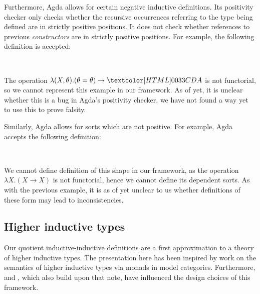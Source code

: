 Furthermore, Agda allows for certain negative inductive
definitions. Its positivity checker only checks whether the recursive
occurrences referring to the type being defined are in strictly
positive positions. It does not check whether references to previous
\emph{constructors} are in strictly positive positions. For example,
the following definition is accepted:
%
\begin{datatype}{\Aty}{\Set}
  \constr{\Aco}{\Aty} \\
  \constr{\Aci}{((\Aco = \Aco) \to \Aty) \to \Aty}
\end{datatype}
%
The operation $\lambda (X,\theta) . (\theta = \theta) \to \Aty$ is not
functorial, so we cannot represent this example in our framework. As
of yet, it is unclear whether this is a bug in Agda's positivity
checker, \ie we have not found a way yet to use this to prove falsity.

Similarly, Agda allows for sorts which are not positive. For example,
Agda accepts the following definition:
%
\begin{sorts}
    \sortnamety{\Aty}{\Set} \\
    \sortnamety{\Bty}{(\Aty \to \Aty) \to \Set}  
\end{sorts}
%
\begin{datatype}{\Aty}{}
  \constr{\Aco}{\Aty}
\end{datatype}
%
\begin{datatype}{\Bty}{}
\end{datatype}
%
We cannot define definition of this shape in our framework, as the
operation $\lambda X . (X \to X)$ is not functorial, hence we cannot
define its dependent sorts. As with the previous example, it is as of
yet unclear to us whether definitions of these form may lead to
inconsistencies.

\subsection{Higher inductive types}

Our quotient inductive-inductive definitions are a first approximation
to a theory of higher inductive types. The presentation here has been
inspired by work on the semantics of higher inductive types
\cite{Lumsdaine2013} via monads in model categories. Furthermore,
\cite{Capriotti2014ii} and \cite{Altenkirch2015ii}, which also build
upon that note, have influenced the design choices of this framework.

